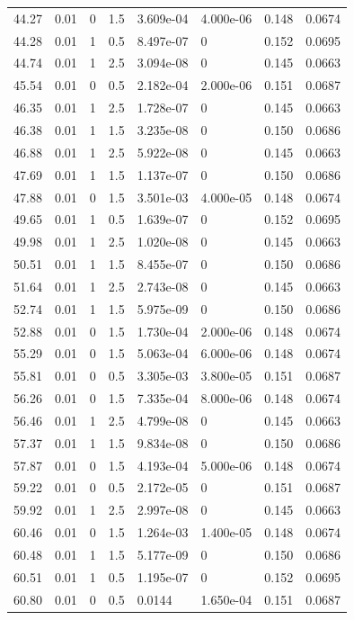 \documentclass[preview]{standalone}
\begin{document}
{{{\begin{tabular}{L{1.2cm}C{1.2cm} C{0.3cm}C{0.5cm} C{1.4cm}C{1.4cm} C{1.4cm}C{1.4cm}}
  44.27  &  0.01  & 0     & 1.5 &  3.609e-04  & 4.000e-06  & 0.148 &  0.0674   \\ 
  44.28  &  0.01  & 1     & 0.5 &  8.497e-07  & 0  & 0.152 &  0.0695   \\ 
  44.74  &  0.01  & 1     & 2.5 &  3.094e-08  & 0  & 0.145 &  0.0663   \\ 
  45.54  &  0.01  & 0     & 0.5 &  2.182e-04  & 2.000e-06  & 0.151 &  0.0687   \\ 
  46.35  &  0.01  & 1     & 2.5 &  1.728e-07  & 0  & 0.145 &  0.0663   \\ 
  46.38  &  0.01  & 1     & 1.5 &  3.235e-08  & 0  & 0.150 &  0.0686   \\ 
  46.88  &  0.01  & 1     & 2.5 &  5.922e-08  & 0  & 0.145 &  0.0663   \\ 
  47.69  &  0.01  & 1     & 1.5 &  1.137e-07  & 0  & 0.150 &  0.0686   \\ 
  47.88  &  0.01  & 0     & 1.5 &  3.501e-03  & 4.000e-05  & 0.148 &  0.0674   \\ 
  49.65  &  0.01  & 1     & 0.5 &  1.639e-07  & 0  & 0.152 &  0.0695   \\ 
  49.98  &  0.01  & 1     & 2.5 &  1.020e-08  & 0  & 0.145 &  0.0663   \\ 
  50.51  &  0.01  & 1     & 1.5 &  8.455e-07  & 0  & 0.150 &  0.0686   \\ 
  51.64  &  0.01  & 1     & 2.5 &  2.743e-08  & 0  & 0.145 &  0.0663   \\ 
  52.74  &  0.01  & 1     & 1.5 &  5.975e-09  & 0  & 0.150 &  0.0686   \\ 
  52.88  &  0.01  & 0     & 1.5 &  1.730e-04  & 2.000e-06  & 0.148 &  0.0674   \\ 
  55.29  &  0.01  & 0     & 1.5 &  5.063e-04  & 6.000e-06  & 0.148 &  0.0674   \\ 
  55.81  &  0.01  & 0     & 0.5 &  3.305e-03  & 3.800e-05  & 0.151 &  0.0687   \\ 
  56.26  &  0.01  & 0     & 1.5 &  7.335e-04  & 8.000e-06  & 0.148 &  0.0674   \\ 
  56.46  &  0.01  & 1     & 2.5 &  4.799e-08  & 0  & 0.145 &  0.0663   \\ 
  57.37  &  0.01  & 1     & 1.5 &  9.834e-08  & 0  & 0.150 &  0.0686   \\ 
  57.87  &  0.01  & 0     & 1.5 &  4.193e-04  & 5.000e-06  & 0.148 &  0.0674   \\ 
  59.22  &  0.01  & 0     & 0.5 &  2.172e-05  & 0  & 0.151 &  0.0687   \\ 
  59.92  &  0.01  & 1     & 2.5 &  2.997e-08  & 0  & 0.145 &  0.0663   \\ 
  60.46  &  0.01  & 0     & 1.5 &  1.264e-03  & 1.400e-05  & 0.148 &  0.0674   \\ 
  60.48  &  0.01  & 1     & 1.5 &  5.177e-09  & 0  & 0.150 &  0.0686   \\ 
  60.51  &  0.01  & 1     & 0.5 &  1.195e-07  & 0  & 0.152 &  0.0695   \\ 
  60.80  &  0.01  & 0     & 0.5 &  0.0144  & 1.650e-04  & 0.151 &  0.0687   \\ 
\hline 
\end{tabular} 

}}}
\end{document}
